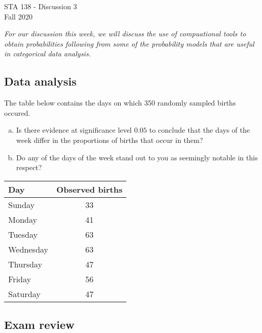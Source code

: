 \documentclass[10pt, oneside]{article}
\begin{document}
\begin{center} STA 138 - Discussion 3\\
  Fall 2020
\end{center}

\emph{For our discussion this week, we will discuss the use of compuational tools to obtain probabilities following from some of the probability models that are useful in categorical data analysis.}


\subsection*{Data analysis}

The table below contains the days on which 350 randomly sampled births occured. 
\begin{enumerate}[(a)]
\item Is there evidence at significance level $0.05$ to conclude that the days of the week differ in the proportions of births that occur in them?
\item Do any of the days of the week stand out to you as seemingly notable in this respect?
\end{enumerate}





\begin{center}
  
  \begin{table}[h!]
    \centering
\begin{tabular}{lc}
  \hline
Day & Observed births \\ 
  \hline
Sunday & 33 \\ 
  Monday & 41 \\ 
  Tuesday & 63 \\ 
  Wednesday & 63 \\ 
  Thursday & 47 \\ 
  Friday & 56 \\ 
  Saturday & 47 \\ 
   \hline
\end{tabular}
\end{table}

\end{center}


\subsection*{Exam review}
\end{document}
